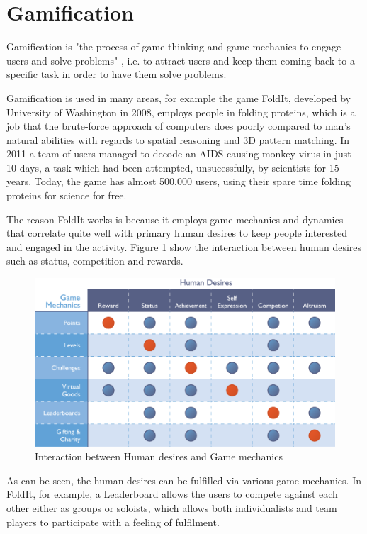 \section{Gamification}\label{sec:gamification}
Gamification is "the process of game-thinking and game mechanics to engage users and solve problems" \cite{Zichermann2011}, i.e. to attract users and keep them coming back to a specific task in order to have them solve problems.

Gamification is used in many areas, for example the game FoldIt, developed by University of Washington in 2008, employs people in folding proteins, which is a job that the brute-force approach of computers does poorly compared to man's natural abilities with regards to spatial reasoning and 3D pattern matching. In 2011 a team of users managed to decode an AIDS-causing monkey virus in just 10 days, a task which had been attempted, unsucessfully, by scientists for 15 years.\cite{Huff2011} Today, the game has almost 500.000 users, using their spare time folding proteins for science for free.\cite{FoldIt2013}

The reason FoldIt works is because it employs game mechanics and dynamics that correlate quite well with primary human desires to keep people interested and engaged in the activity.
Figure \ref{fig:bunchball} show the interaction between human desires such as status, competition and rewards.

\begin{figure}[hptb]
  \centering
    \includegraphics[width=\textwidth]{img/bunchball.png}
  \caption{Interaction between Human desires and Game mechanics}
  \label{fig:bunchball}
\end{figure}

As can be seen, the human desires can be fulfilled via various game mechanics. In FoldIt, for example, a Leaderboard allows the users to compete against each other either as groups or soloists, which allows both individualists and team players to participate with a feeling of fulfilment. 

